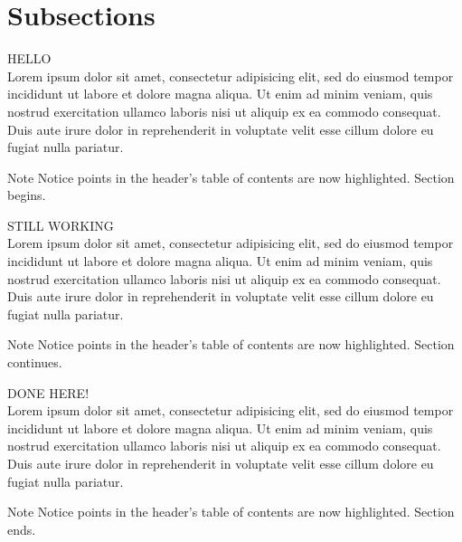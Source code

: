 \section{Subsections}


{
\begin{multicols}{2}
HELLO \\
Lorem ipsum dolor sit amet, consectetur adipisicing elit, sed do eiusmod tempor incididunt ut labore et dolore magna aliqua. Ut enim ad minim veniam, quis nostrud exercitation ullamco laboris nisi ut aliquip ex ea commodo consequat. Duis aute irure dolor in reprehenderit in voluptate velit esse cillum dolore eu fugiat nulla pariatur.
\end{multicols}

\begin{block}{Note}
Notice points in the header's table of contents are now highlighted.
Section begins.
\end{block}
}


{
\begin{multicols}{2}
STILL WORKING \\
Lorem ipsum dolor sit amet, consectetur adipisicing elit, sed do eiusmod tempor incididunt ut labore et dolore magna aliqua. Ut enim ad minim veniam, quis nostrud exercitation ullamco laboris nisi ut aliquip ex ea commodo consequat. Duis aute irure dolor in reprehenderit in voluptate velit esse cillum dolore eu fugiat nulla pariatur.
\end{multicols}

\begin{block}{Note}
Notice points in the header's table of contents are now highlighted.
Section continues.
\end{block}
}


{
\begin{multicols}{2}
DONE HERE! \\
Lorem ipsum dolor sit amet, consectetur adipisicing elit, sed do eiusmod tempor incididunt ut labore et dolore magna aliqua. Ut enim ad minim veniam, quis nostrud exercitation ullamco laboris nisi ut aliquip ex ea commodo consequat. Duis aute irure dolor in reprehenderit in voluptate velit esse cillum dolore eu fugiat nulla pariatur.
\end{multicols}

\begin{block}{Note}
Notice points in the header's table of contents are now highlighted.
Section ends.
\end{block}
}


